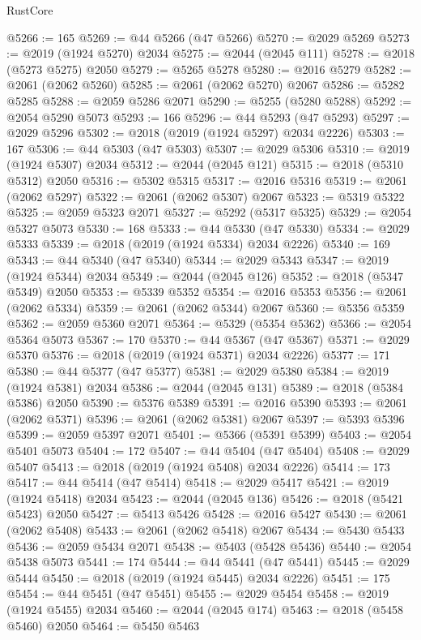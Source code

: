 \begin{lexlean}{RustCore}
\begin{coremodule}
@5266 := 165
@5269 := @44 @5266 (@47 @5266)
@5270 := @2029 @5269
@5273 := @2019 (@1924 @5270) @2034
@5275 := @2044 (@2045 @111)
@5278 := @2018 (@5273 @5275) @2050
@5279 := @5265 @5278
@5280 := @2016 @5279
@5282 := @2061 (@2062 @5260)
@5285 := @2061 (@2062 @5270) @2067
@5286 := @5282 @5285
@5288 := @2059 @5286 @2071
@5290 := @5255 (@5280 @5288)
@5292 := @2054 @5290 @5073
@5293 := 166
@5296 := @44 @5293 (@47 @5293)
@5297 := @2029 @5296
@5302 := @2018 (@2019 (@1924 @5297) @2034 @2226)
@5303 := 167
@5306 := @44 @5303 (@47 @5303)
@5307 := @2029 @5306
@5310 := @2019 (@1924 @5307) @2034
@5312 := @2044 (@2045 @121)
@5315 := @2018 (@5310 @5312) @2050
@5316 := @5302 @5315
@5317 := @2016 @5316
@5319 := @2061 (@2062 @5297)
@5322 := @2061 (@2062 @5307) @2067
@5323 := @5319 @5322
@5325 := @2059 @5323 @2071
@5327 := @5292 (@5317 @5325)
@5329 := @2054 @5327 @5073
@5330 := 168
@5333 := @44 @5330 (@47 @5330)
@5334 := @2029 @5333
@5339 := @2018 (@2019 (@1924 @5334) @2034 @2226)
@5340 := 169
@5343 := @44 @5340 (@47 @5340)
@5344 := @2029 @5343
@5347 := @2019 (@1924 @5344) @2034
@5349 := @2044 (@2045 @126)
@5352 := @2018 (@5347 @5349) @2050
@5353 := @5339 @5352
@5354 := @2016 @5353
@5356 := @2061 (@2062 @5334)
@5359 := @2061 (@2062 @5344) @2067
@5360 := @5356 @5359
@5362 := @2059 @5360 @2071
@5364 := @5329 (@5354 @5362)
@5366 := @2054 @5364 @5073
@5367 := 170
@5370 := @44 @5367 (@47 @5367)
@5371 := @2029 @5370
@5376 := @2018 (@2019 (@1924 @5371) @2034 @2226)
@5377 := 171
@5380 := @44 @5377 (@47 @5377)
@5381 := @2029 @5380
@5384 := @2019 (@1924 @5381) @2034
@5386 := @2044 (@2045 @131)
@5389 := @2018 (@5384 @5386) @2050
@5390 := @5376 @5389
@5391 := @2016 @5390
@5393 := @2061 (@2062 @5371)
@5396 := @2061 (@2062 @5381) @2067
@5397 := @5393 @5396
@5399 := @2059 @5397 @2071
@5401 := @5366 (@5391 @5399)
@5403 := @2054 @5401 @5073
@5404 := 172
@5407 := @44 @5404 (@47 @5404)
@5408 := @2029 @5407
@5413 := @2018 (@2019 (@1924 @5408) @2034 @2226)
@5414 := 173
@5417 := @44 @5414 (@47 @5414)
@5418 := @2029 @5417
@5421 := @2019 (@1924 @5418) @2034
@5423 := @2044 (@2045 @136)
@5426 := @2018 (@5421 @5423) @2050
@5427 := @5413 @5426
@5428 := @2016 @5427
@5430 := @2061 (@2062 @5408)
@5433 := @2061 (@2062 @5418) @2067
@5434 := @5430 @5433
@5436 := @2059 @5434 @2071
@5438 := @5403 (@5428 @5436)
@5440 := @2054 @5438 @5073
@5441 := 174
@5444 := @44 @5441 (@47 @5441)
@5445 := @2029 @5444
@5450 := @2018 (@2019 (@1924 @5445) @2034 @2226)
@5451 := 175
@5454 := @44 @5451 (@47 @5451)
@5455 := @2029 @5454
@5458 := @2019 (@1924 @5455) @2034
@5460 := @2044 (@2045 @174)
@5463 := @2018 (@5458 @5460) @2050
@5464 := @5450 @5463

\end{coremodule}
\end{lexlean}
